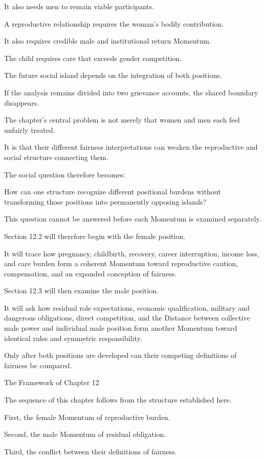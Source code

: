 It also needs men to remain viable participants.

A reproductive relationship requires the woman’s bodily contribution.

It also requires credible male and institutional return Momentum.

The child requires care that exceeds gender competition.

The future social island depends on the integration of both positions.

If the analysis remains divided into two grievance accounts, the shared boundary disappears.

The chapter’s central problem is not merely that women and men each feel unfairly treated.

It is that their different fairness interpretations can weaken the reproductive and social structure connecting them.

The social question therefore becomes:

How can one structure recognize different positional burdens without transforming those positions into permanently opposing islands?

This question cannot be answered before each Momentum is examined separately.

Section 12.2 will therefore begin with the female position.

It will trace how pregnancy, childbirth, recovery, career interruption, income loss, and care burden form a coherent Momentum toward reproductive caution, compensation, and an expanded conception of fairness.

Section 12.3 will then examine the male position.

It will ask how residual role expectations, economic qualification, military and dangerous obligations, direct competition, and the Distance between collective male power and individual male position form another Momentum toward identical rules and symmetric responsibility.

Only after both positions are developed can their competing definitions of fairness be compared.

The Framework of Chapter 12

The sequence of this chapter follows from the structure established here.

First, the female Momentum of reproductive burden.

Second, the male Momentum of residual obligation.

Third, the conflict between their definitions of fairness.

